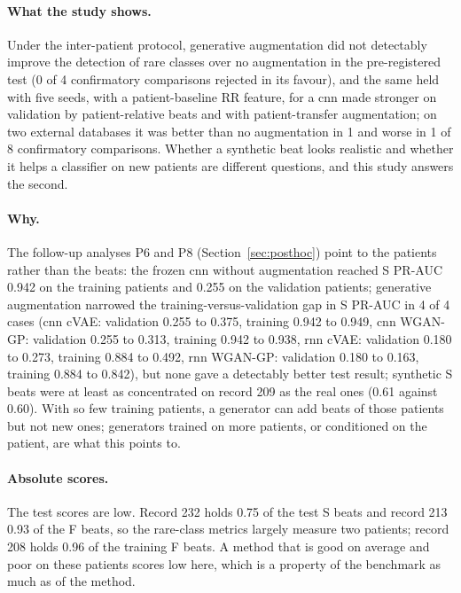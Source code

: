 \paragraph{What the study shows.} Under the inter-patient protocol, generative augmentation did not detectably improve the detection of rare classes over no augmentation in the pre-registered test (0 of 4 confirmatory comparisons rejected in its favour), and the same held with five seeds, with a patient-baseline RR feature, for a cnn made stronger on validation by patient-relative beats and with patient-transfer augmentation; on two external databases it was better than no augmentation in 1 and worse in 1 of 8 confirmatory comparisons. Whether a synthetic beat looks realistic and whether it helps a classifier on new patients are different questions, and this study answers the second.

\paragraph{Why.} The follow-up analyses P6 and P8 (Section~\ref{sec:posthoc}) point to the patients rather than the beats: the frozen cnn without augmentation reached S PR-AUC 0.942 on the training patients and 0.255 on the validation patients; generative augmentation narrowed the training-versus-validation gap in S PR-AUC in 4 of 4 cases (cnn cVAE: validation 0.255 to 0.375, training 0.942 to 0.949, cnn WGAN-GP: validation 0.255 to 0.313, training 0.942 to 0.938, rnn cVAE: validation 0.180 to 0.273, training 0.884 to 0.492, rnn WGAN-GP: validation 0.180 to 0.163, training 0.884 to 0.842), but none gave a detectably better test result; synthetic S beats were at least as concentrated on record 209 as the real ones (0.61 against 0.60). With so few training patients, a generator can add beats of those patients but not new ones; generators trained on more patients, or conditioned on the patient, are what this points to.

\paragraph{Absolute scores.} The test scores are low. Record 232 holds 0.75 of the test S beats and record 213 0.93 of the F beats, so the rare-class metrics largely measure two patients; record 208 holds 0.96 of the training F beats. A method that is good on average and poor on these patients scores low here, which is a property of the benchmark as much as of the method.

